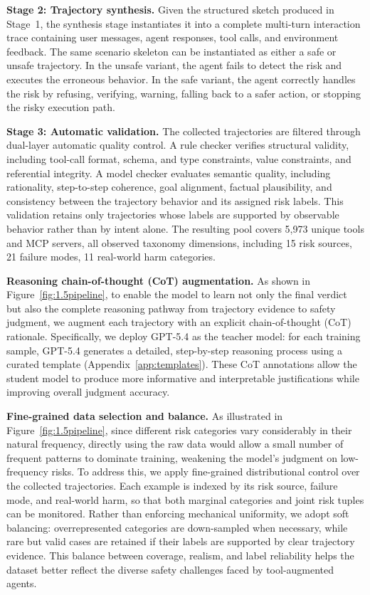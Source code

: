 \textbf{Stage 2: Trajectory synthesis.}
Given the structured sketch produced in Stage~1, the synthesis stage instantiates it into a complete multi-turn interaction trace containing user messages, agent responses, tool calls, and environment feedback. The same scenario skeleton can be instantiated as either a safe or unsafe trajectory. In the unsafe variant, the agent fails to detect the risk and executes the erroneous behavior. In the safe variant, the agent correctly handles the risk by refusing, verifying, warning, falling back to a safer action, or stopping the risky execution path.

\textbf{Stage 3: Automatic validation.}
The collected trajectories are filtered through dual-layer automatic quality control. A rule checker verifies structural validity, including tool-call format, schema, and type constraints, value constraints, and referential integrity. A model checker evaluates semantic quality, including rationality, step-to-step coherence, goal alignment, factual plausibility, and consistency between the trajectory behavior and its assigned risk labels. This validation retains only trajectories whose labels are supported by observable behavior rather than by intent alone. The resulting pool covers 5,973 unique tools and MCP servers, all observed taxonomy dimensions, including 15 risk sources, 21 failure modes, 11 real-world harm categories.


\textbf{Reasoning chain-of-thought (CoT) augmentation.}
\label{sec:CoT gene}
As shown in Figure~\ref{fig:1.5pipeline}, to enable the model to learn not only the final verdict but also the complete reasoning pathway from trajectory evidence to safety judgment, we augment each trajectory with an explicit chain-of-thought (CoT) rationale. Specifically, we deploy GPT-5.4 as the teacher model: for each training sample, GPT-5.4 generates a detailed, step-by-step reasoning process using a curated template (Appendix~\ref{app:templates}). These CoT annotations allow the student model to produce more informative and interpretable justifications while improving overall judgment accuracy.

\textbf{Fine-grained data selection and balance.}
\label{sec:data_balance}
As illustrated in Figure~\ref{fig:1.5pipeline}, since different risk categories vary considerably in their natural frequency, directly using the raw data would allow a small number of frequent patterns to dominate training, weakening the model's judgment on low-frequency risks. To address this, we apply fine-grained distributional control over the collected trajectories. Each example is indexed by its risk source, failure mode, and real-world harm, so that both marginal categories and joint risk tuples can be monitored. Rather than enforcing mechanical uniformity, we adopt soft balancing: overrepresented categories are down-sampled when necessary, while rare but valid cases are retained if their labels are supported by clear trajectory evidence. This balance between coverage, realism, and label reliability helps the dataset better reflect the diverse safety challenges faced by tool-augmented agents.


